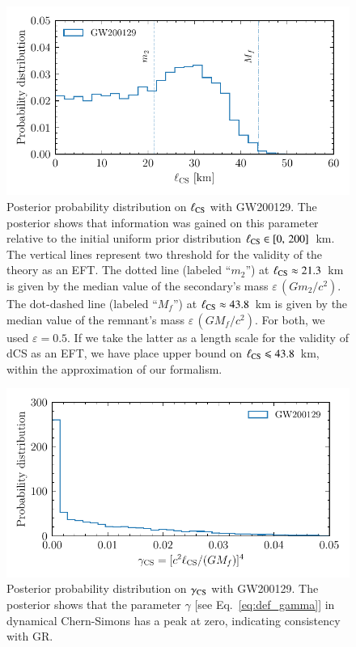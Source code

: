 \documentclass[twocolumn,prd,aps,superscriptaddress,preprintnumbers,tightenlines,showpacs,nofootinbib,eqsecnum,amsfonts,amsmath,longbibliography]{revtex4-1}
\begin{document}
\begin{figure}[t]
\includegraphics[width=\columnwidth]{figs/dcs_GW200129.pdf}
\caption{Posterior probability distribution on $\ell_{\rm CS}$ with GW200129.
The posterior shows that information was gained on this parameter relative to
the initial uniform prior distribution $\ell_{\rm CS} \in [0,\, 200]$~km.
%
The vertical lines represent two threshold for the validity of the theory as
an EFT.
%
The dotted line (labeled ``$m_2$'') at $\ell_{\rm CS} \approx 21.3$~km is
given by the median value of the secondary's mass $\varepsilon \, (G m_2 / c^2)$.
%
The dot-dashed line (labeled ``$M_{f}$'') at $\ell_{\rm CS} \approx 43.8$~km is
given by the median value of the remnant's mass $\varepsilon \, (G M_{f} / c^2)$.
%
For both, we used $\varepsilon = 0.5$.
%
If we take the latter as a length scale for the validity of dCS as an EFT, we
have place upper bound on $\ell_{\rm CS} \leqslant 43.8$~km, within the
approximation of our formalism.
}
\label{fig:dCS_bounds}
\end{figure}

\begin{figure}[t]
\includegraphics[width=\columnwidth]{figs/dcs_gamma_GW200129.pdf}
\caption{Posterior probability distribution on $\gamma_{\rm CS}$ with GW200129.
The posterior shows that the parameter $\gamma$ [see Eq.~\eqref{eq:def_gamma}]
in dynamical Chern-Simons has a peak at zero, indicating consistency with GR.
}
\label{fig:dCS_gamma_plot}
\end{figure}
\end{document}
